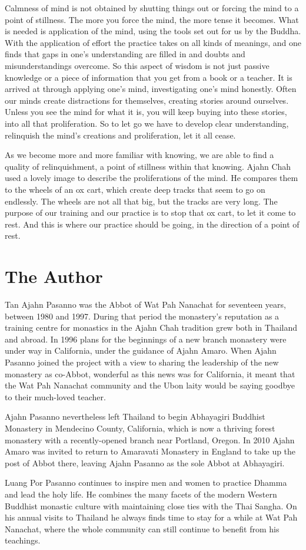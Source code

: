 Calmness of mind is not obtained by shutting things out or forcing the
mind to a point of stillness. The more you force the mind, the more
tense it becomes. What is needed is application of the mind, using the
tools set out for us by the Buddha. With the application of effort the
practice takes on all kinds of meanings, and one finds that gaps in
one's understanding are filled in and doubts and misunderstandings
overcome. So this aspect of wisdom is not just passive knowledge or a
piece of information that you get from a book or a teacher. It is
arrived at through applying one's mind, investigating one's mind
honestly. Often our minds create distractions for themselves, creating
stories around ourselves. Unless you see the mind for what it is, you
will keep buying into these stories, into all that proliferation. So to
let go we have to develop clear understanding, relinquish the mind's
creations and proliferation, let it all cease. 

As we become more and more familiar with knowing, we are able to find a
quality of relinquishment, a point of stillness within that knowing. 
Ajahn Chah used a lovely image to describe the proliferations of the
mind. He compares them to the wheels of an ox cart, which create deep
tracks that seem to go on endlessly. The wheels are not all that big, 
but the tracks are very long. The purpose of our training and our
practice is to stop that ox cart, to let it come to rest. And this is
where our practice should be going, in the direction of a point of rest. 

\dividerRule

\section{The Author}

Tan Ajahn Pasanno was the Abbot of Wat Pah Nanachat for seventeen
years, between 1980 and 1997. During that period the monastery's
reputation as a training centre for monastics in the Ajahn Chah
tradition grew both in Thailand and abroad. In 1996 plans for the
beginnings of a new branch monastery were under way in California, under
the guidance of Ajahn Amaro. When Ajahn Pasanno joined the project with
a view to sharing the leadership of the new monastery as co-Abbot, 
wonderful as this news was for California, it meant that the Wat Pah
Nanachat community and the Ubon laity would be saying goodbye to their
much-loved teacher.

Ajahn Pasanno nevertheless left Thailand to begin Abhayagiri Buddhist
Monastery in Mendecino County, California, which is now a thriving
forest monastery with a recently-opened branch near Portland, Oregon. In
2010 Ajahn Amaro was invited to return to Amaravati Monastery in England
to take up the post of Abbot there, leaving Ajahn Pasanno as the sole
Abbot at Abhayagiri. 

Luang Por Pasanno continues to inspire men and women to practice
Dhamma and lead the holy life. He combines the many facets of the modern
Western Buddhist monastic culture with maintaining close ties with the
Thai Sangha. On his annual visits to Thailand he always finds time to
stay for a while at Wat Pah Nanachat, where the whole community can
still continue to benefit from his teachings.

